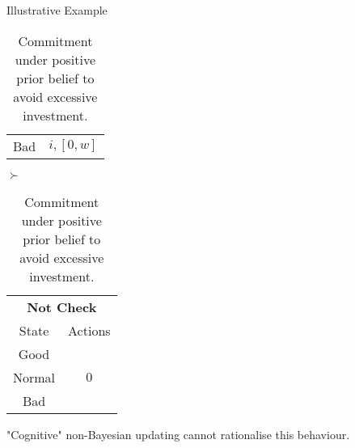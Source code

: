 \documentclass[usenames,dvipsnames,aspectratio=169,11pt, envcountsect]{beamer}
\begin{document}
\begin{frame}[noframenumbering]{Illustrative Example}
\begin{table}[H]
\begin{minipage}{0.29\textwidth}
\begin{tabular}{c | c}
				Bad                          & \(  i, \left[0, w \right] \)                                                   \\
			\end{tabular}
			\vspace{0.5cm} %
		\end{minipage}\hspace{0.3cm} %
		\( \succ \) %
		\begin{minipage}{0.29\textwidth}
			\centering
			\begin{tabular}{c | c}
				\multicolumn{2}{c}{\textbf{Not Check}} \\
				State  & Actions                       \\
				\hline
				Good   & \multirow{3}{*}{ \( 0 \)}     \\
				Normal &                               \\
				Bad    &                               \\
			\end{tabular}
			\vspace{0.5cm} %
		\end{minipage}
		\caption{Commitment under positive prior belief to avoid excessive investment.} %
		\label{tab:commitment}
	\end{table}

	\vfill

	"Cognitive" non-Bayesian updating \citep{epsteinAxiomaticModelNonBayesian2006} cannot rationalise this behaviour.

\end{frame}
\end{document}
